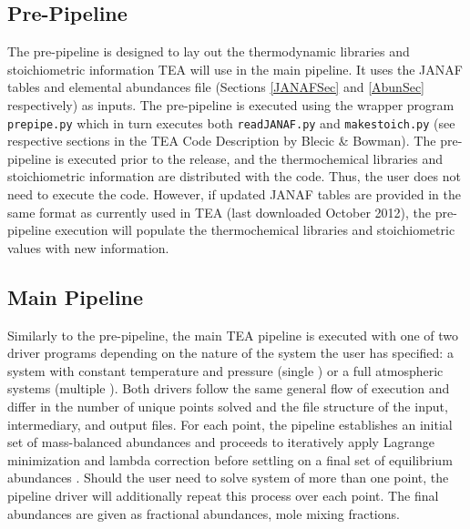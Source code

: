 \subsection{Pre-Pipeline}
\label{pre-pipe}
  The pre-pipeline is designed to lay out the thermodynamic libraries
  and stoichiometric information TEA will use in the main pipeline. It
  uses the JANAF tables and elemental abundances file
  (Sections \ref{JANAFSec} and \ref{AbunSec} respectively) as inputs.
  The pre-pipeline is executed using the wrapper
  program \texttt{prepipe.py} which in turn executes
  both \texttt{readJANAF.py} and \texttt{makestoich.py} (see
  respective sections in the TEA Code Description by Blecic \&
  Bowman).  The pre-pipeline is executed prior to the release, and the
  thermochemical libraries and stoichiometric information are
  distributed with the code. Thus, the user does not need to execute
  the code. However, if updated JANAF tables are provided in the same
  format as currently used in TEA (last downloaded October 2012), the
  pre-pipeline execution will populate the thermochemical libraries
  and stoichiometric values with new information.

\subsection{Main Pipeline}
\label{pipel}
  Similarly to the pre-pipeline, the main TEA pipeline is executed
  with one of two driver programs depending on the nature of the
  system the user has specified: a system with constant temperature
  and pressure (single ) or a full atmospheric systems
  (multiple ). Both drivers follow the same general flow of
  execution and differ in the number of unique  points
  solved and the file structure of the input, intermediary, and output
  files.  For each  point, the pipeline establishes an
  initial set of mass-balanced abundances and proceeds to iteratively
  apply Lagrange minimization and lambda correction before settling on
  a final set of equilibrium
  abundances \citep{BlecicEtal2015-TEAtheory}. Should the user need to
  solve system of more than one  point, the pipeline driver
  will additionally repeat this process over each 
  point. The final abundances are given as fractional abundances, mole
  mixing fractions.



